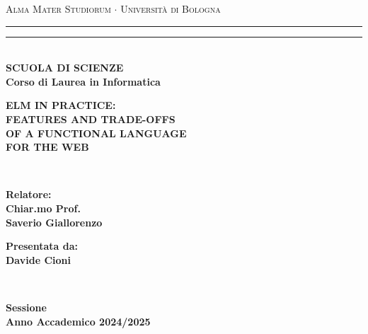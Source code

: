 \begin{titlepage}
    \begin{center}
        {{\Large{\textsc{Alma Mater Studiorum $\cdot$ Università di Bologna}}}}
        \rule[0.1cm]{\textwidth}{0.1mm}
        \rule[0.5cm]{\textwidth}{0.6mm}\\
        {\small{\bf SCUOLA DI SCIENZE\\
            Corso di Laurea in Informatica}}
    \end{center}

    \vspace{25mm}

    \begin{center}
        {\LARGE{\bf ELM IN PRACTICE: }}\\
        \vspace{3mm}
        {\LARGE{\bf FEATURES AND TRADE-OFFS }}\\
        \vspace{3mm}
        {\LARGE{\bf OF A FUNCTIONAL LANGUAGE }}\\
        \vspace{3mm}
        {\LARGE{\bf FOR THE WEB }}\\
    \end{center}

    \vspace{60mm}
    \par
    \noindent
    \begin{minipage}[t]{0.04\textwidth}
        ~
    \end{minipage}
    \begin{minipage}[t]{0.4\textwidth}
        \large{\bf Relatore:\\
            Chiar.mo Prof.\\
            Saverio Giallorenzo}
        \vspace{3mm}\\
    \end{minipage}
    \hfill
    \begin{minipage}[t]{0.4\textwidth}\raggedleft
        {\large{\bf Presentata da:\\
                Davide Cioni}}
    \end{minipage}
    \begin{minipage}[t]{0.04\textwidth}
        ~
    \end{minipage}

    \vspace{20mm}

    \begin{center}
        {\large{\bf {} Sessione\\
                Anno Accademico 2024/2025 }}
    \end{center}
\end{titlepage}
